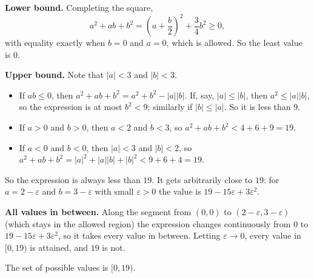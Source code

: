 \textbf{Lower bound.} Completing the square,
\[a^2+ab+b^2=\left(a+\dfrac b2\right)^2+\dfrac34b^2\ge0,\]
with equality exactly when $b=0$ and $a=0$, which is allowed. So the least value is $0$.

\textbf{Upper bound.} Note that $|a|<3$ and $|b|<3$.
\begin{itemize}
\item If $ab\le0$, then $a^2+ab+b^2=a^2+b^2-|a||b|$. If, say, $|a|\le|b|$, then $a^2\le|a||b|$, so the expression is at most $b^2<9$; similarly if $|b|\le|a|$. So it is less than $9$.
\item If $a>0$ and $b>0$, then $a<2$ and $b<3$, so $a^2+ab+b^2<4+6+9=19$.
\item If $a<0$ and $b<0$, then $|a|<3$ and $|b|<2$, so $a^2+ab+b^2=|a|^2+|a||b|+|b|^2<9+6+4=19$.
\end{itemize}
So the expression is always less than $19$. It gets arbitrarily close to $19$: for $a=2-\varepsilon$ and $b=3-\varepsilon$ with small $\varepsilon>0$ the value is $19-15\varepsilon+3\varepsilon^2$.

\textbf{All values in between.} Along the segment from $(0,0)$ to $(2-\varepsilon,3-\varepsilon)$ (which stays in the allowed region) the expression changes continuously from $0$ to $19-15\varepsilon+3\varepsilon^2$, so it takes every value in between. Letting $\varepsilon\to0$, every value in $[0,19)$ is attained, and $19$ is not.

The set of possible values is $\boxed{[0,19)}$.
